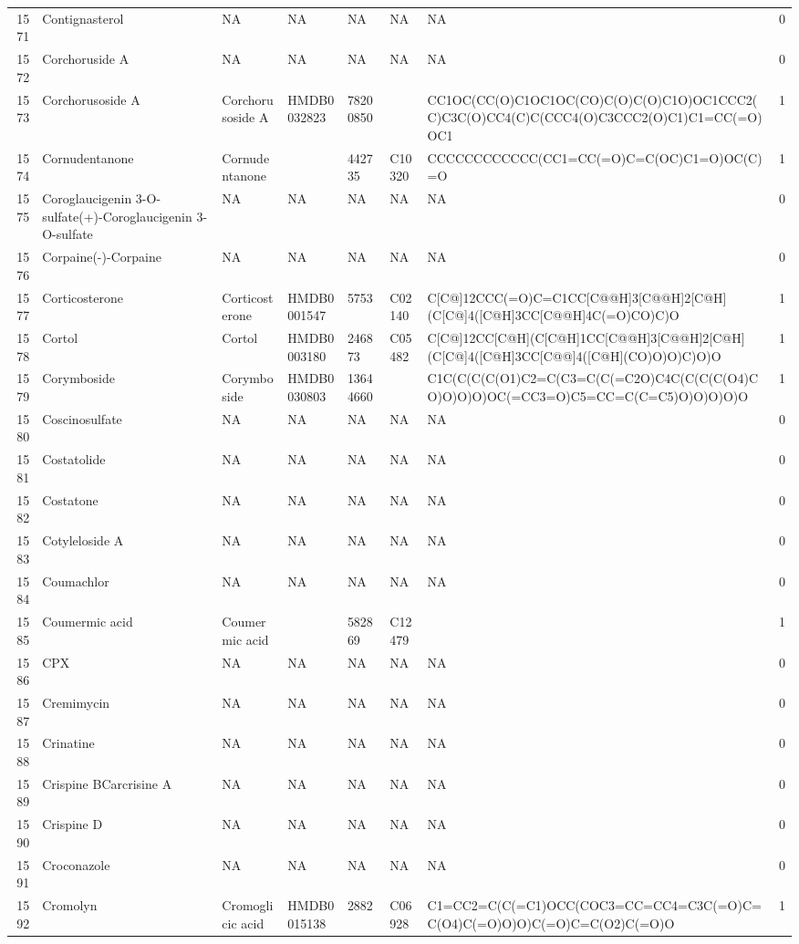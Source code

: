 \documentclass[a4paper]{article}
\begin{document}
\begin{longtable}{rlllllll}
  1571 & Contignasterol & NA & NA & NA & NA & NA & 0 \\ 
  1572 & Corchoruside A & NA & NA & NA & NA & NA & 0 \\ 
  1573 & Corchorusoside A & Corchorusoside A & HMDB0032823 & 78200850 &  & CC1OC(CC(O)C1OC1OC(CO)C(O)C(O)C1O)OC1CCC2(C)C3C(O)CC4(C)C(CCC4(O)C3CCC2(O)C1)C1=CC(=O)OC1 & 1 \\ 
  1574 & Cornudentanone & Cornudentanone &  & 442735 & C10320 & CCCCCCCCCCCC(CC1=CC(=O)C=C(OC)C1=O)OC(C)=O & 1 \\ 
  1575 & Coroglaucigenin 3-O-sulfate(+)-Coroglaucigenin 3-O-sulfate & NA & NA & NA & NA & NA & 0 \\ 
  1576 & Corpaine(-)-Corpaine & NA & NA & NA & NA & NA & 0 \\ 
  1577 & Corticosterone & Corticosterone & HMDB0001547 & 5753 & C02140 & C[C@]12CCC(=O)C=C1CC[C@@H]3[C@@H]2[C@H](C[C@]4([C@H]3CC[C@@H]4C(=O)CO)C)O & 1 \\ 
  1578 & Cortol & Cortol & HMDB0003180 & 246873 & C05482 & C[C@]12CC[C@H](C[C@H]1CC[C@@H]3[C@@H]2[C@H](C[C@]4([C@H]3CC[C@@]4([C@H](CO)O)O)C)O)O & 1 \\ 
  1579 & Corymboside & Corymboside & HMDB0030803 & 13644660 &  & C1C(C(C(C(O1)C2=C(C3=C(C(=C2O)C4C(C(C(C(O4)CO)O)O)O)OC(=CC3=O)C5=CC=C(C=C5)O)O)O)O)O & 1 \\ 
  1580 & Coscinosulfate & NA & NA & NA & NA & NA & 0 \\ 
  1581 & Costatolide & NA & NA & NA & NA & NA & 0 \\ 
  1582 & Costatone & NA & NA & NA & NA & NA & 0 \\ 
  1583 & Cotyleloside A & NA & NA & NA & NA & NA & 0 \\ 
  1584 & Coumachlor & NA & NA & NA & NA & NA & 0 \\ 
  1585 & Coumermic acid & Coumermic acid &  & 582869 & C12479 &  & 1 \\ 
  1586 & CPX & NA & NA & NA & NA & NA & 0 \\ 
  1587 & Cremimycin & NA & NA & NA & NA & NA & 0 \\ 
  1588 & Crinatine & NA & NA & NA & NA & NA & 0 \\ 
  1589 & Crispine BCarcrisine A & NA & NA & NA & NA & NA & 0 \\ 
  1590 & Crispine D & NA & NA & NA & NA & NA & 0 \\ 
  1591 & Croconazole & NA & NA & NA & NA & NA & 0 \\ 
  1592 & Cromolyn & Cromoglicic acid & HMDB0015138 & 2882 & C06928 & C1=CC2=C(C(=C1)OCC(COC3=CC=CC4=C3C(=O)C=C(O4)C(=O)O)O)C(=O)C=C(O2)C(=O)O & 1 \\ 

\end{longtable}
\end{document}
